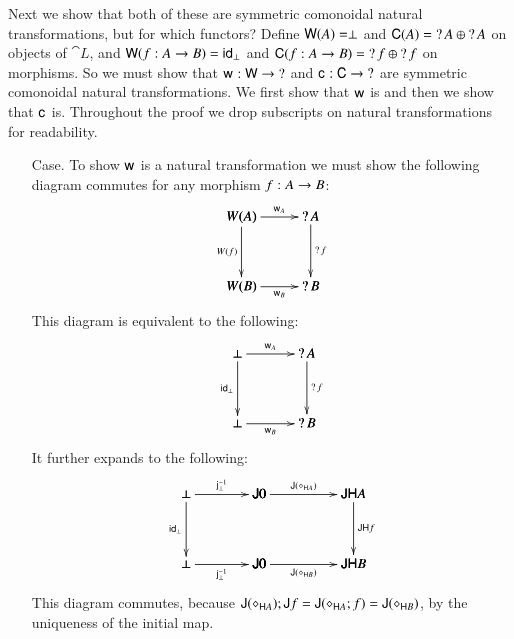  Next we show that both of these are symmetric comonoidal natural
  transformations, but for which functors?  Define $\mathsf{W}(A) =
  \perp$ and $\mathsf{C}(A) = \mathop{?} A \oplus \mathop{?} A$ on objects of
  $\cat{L}$, and $\mathsf{W}(f : A \rightarrow B) = \mathsf{id}_\perp$ and $\mathsf{C}(f
  : A \rightarrow B) = \mathop{?} f \oplus \mathop{?} f$ on morphisms.  So we must show
  that $\mathsf{w}_{} : \mathsf{W} \rightarrow \mathop{?}$ and $\mathsf{c}_{} : \mathsf{C} \rightarrow \mathop{?}$ are
  symmetric comonoidal natural transformations.  We first show that
  $\mathsf{w}_{}$ is and then we show that $\mathsf{c}_{}$ is.  Throughout the proof we
  drop subscripts on natural transformations for readability.
  \begin{itemize}
  \item[Case.] To show $\mathsf{w}_{}$ is a natural transformation we must show
    the following diagram commutes for any morphism $f : A \rightarrow B$:
    \[
    \bfig
    \square[W(A)`\wn A`W(B)`\wn B;\w{A}`W(f)`\wn f`\w{B}]
    \efig
    \]
    This diagram is equivalent to the following:
    \[
    \bfig
    \square[\perp`\wn A`\perp`\wn B;\w{A}`\id_{\perp}`\wn f`\w{B}]
    \efig
    \]
    It further expands to the following:
    \[
    \bfig
    \hSquares/->`->`->``->`->`->/[\perp`\func{J}0`\func{JH}A`\perp`\func{J}0`\func{JH}B;\jinv{\perp}`\func{J}(\diamond_{\func{H}A})`\id_\perp``\func{JH}f`\jinv{\perp}`\func{J}(\diamond_{\func{H}B})]
    \efig
    \]
    This diagram commutes, because
    $\mathsf{J}(\diamond_{\mathsf{H}A});\mathsf{J}f =
    \mathsf{J}(\diamond_{\mathsf{H}A};f) =
    \mathsf{J}(\diamond_{\mathsf{H}B})$, by the uniqueness of the initial
    map.


\end{itemize}

